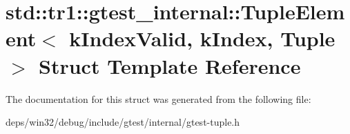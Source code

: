 \hypertarget{structstd_1_1tr1_1_1gtest__internal_1_1_tuple_element}{}\section{std\+:\+:tr1\+:\+:gtest\+\_\+internal\+:\+:Tuple\+Element$<$ k\+Index\+Valid, k\+Index, Tuple $>$ Struct Template Reference}
\label{structstd_1_1tr1_1_1gtest__internal_1_1_tuple_element}


The documentation for this struct was generated from the following file\+:\begin{DoxyCompactItemize}
\item 
deps/win32/debug/include/gtest/internal/gtest-\/tuple.\+h\end{DoxyCompactItemize}
